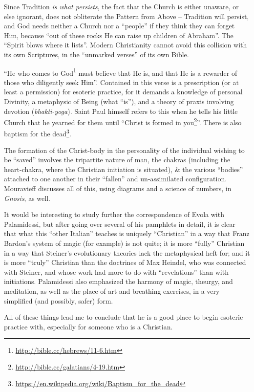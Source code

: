 Since Tradition \emph{is what persists}, the fact that the Church is either unaware, or else ignorant, does not obliterate the Pattern from Above -- Tradition will persist, and God needs neither a Church nor a ``people'' if they think they can forget Him, because ``out of these rocks He can raise up children of Abraham''. The ``Spirit blows where it lists''. Modern Christianity cannot avoid this collision with its own Scriptures, in the ``unmarked verses'' of its own Bible.

``He who comes to God\footnote{\url{http://bible.cc/hebrews/11-6.htm}} must believe that He is, and that He is a rewarder of those who diligently seek Him''. Contained in this verse is a prescription (or at least a permission) for esoteric practice, for it demands a knowledge of personal Divinity, a metaphysic of Being (what ``is''), and a theory of praxis involving devotion (\emph{bhakti-yoga}). Saint Paul himself refers to this when he tells his little Church that he yearned for them until ``Christ is formed in you\footnote{\url{http://bible.cc/galatians/4-19.htm}}''. There is also baptism for the dead\footnote{\url{https://en.wikipedia.org/wiki/Baptism_for_the_dead}}.

The formation of the Christ-body in the personality of the individual wishing to be ``saved'' involves the tripartite nature of man, the chakras (including the heart-chakra, where the Christian initiation is situated), \& the various ``bodies'' attached to one another in their ``fallen'' and un-assimilated configuration. Mouravieff discusses all of this, using diagrams and a science of numbers, in \emph{Gnosis}, as well.

It would be interesting to study further the correspondence of Evola with Palamidessi, but after going over several of his pamphlets in detail, it is clear that what this ``other Italian'' teaches is uniquely ``Christian'' in a way that Franz Bardon's system of magic (for example) is not quite; it is more ``fully'' Christian in a way that Steiner's evolutionary theories lack the metaphysical heft for; and it is more ``truly'' Christian than the doctrines of Max Heindel, who was connected with Steiner, and whose work had more to do with ``revelations'' than with initiations. Palamidessi also emphasized the harmony of magic, theurgy, and meditation, as well as the place of art and breathing exercises, in a very simplified (and possibly, safer) form.

All of these things lead me to conclude that he is a good place to begin esoteric practice with, especially for someone who is a Christian.

